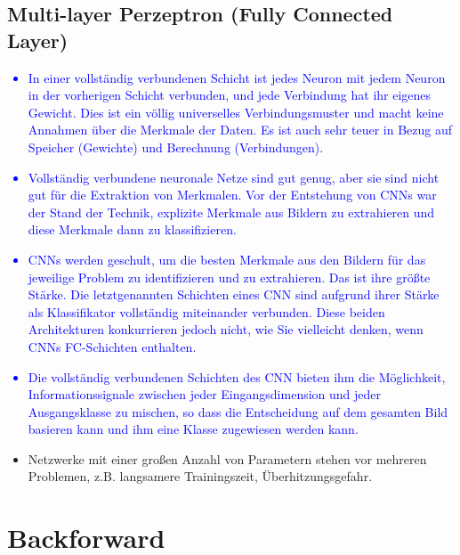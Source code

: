 \documentclass[12pt,a4paper]{scrartcl}
\numberwithin{equation}{section}
\begin{document}
\subsection{Multi-layer Perzeptron (Fully Connected Layer)}
\textcolor{blue}{
	\begin{itemize}
		\item In einer vollständig verbundenen Schicht ist jedes Neuron mit jedem Neuron in der vorherigen Schicht verbunden, und jede Verbindung hat ihr eigenes Gewicht. Dies ist ein völlig universelles Verbindungsmuster und macht keine Annahmen über die Merkmale der Daten. Es ist auch sehr teuer in Bezug auf Speicher (Gewichte) und Berechnung (Verbindungen).
		\item Vollständig verbundene neuronale Netze sind gut genug, aber sie sind nicht gut für die Extraktion von Merkmalen. Vor der Entstehung von CNNs war der Stand der Technik, explizite Merkmale aus Bildern zu extrahieren und diese Merkmale dann zu klassifizieren.
		\item CNNs werden geschult, um die besten Merkmale aus den Bildern für das jeweilige Problem zu identifizieren und zu extrahieren. Das ist ihre größte Stärke. Die letztgenannten Schichten eines CNN sind aufgrund ihrer Stärke als Klassifikator vollständig miteinander verbunden. Diese beiden Architekturen konkurrieren jedoch nicht, wie Sie vielleicht denken, wenn CNNs FC-Schichten enthalten.
		\item Die vollständig verbundenen Schichten des CNN bieten ihm die Möglichkeit, Informationssignale zwischen jeder Eingangsdimension und jeder Ausgangsklasse zu mischen, so dass die Entscheidung auf dem gesamten Bild basieren kann und ihm eine Klasse zugewiesen werden kann.
	\end{itemize}}
\begin{itemize}
	\item Netzwerke mit einer großen Anzahl von Parametern stehen vor mehreren Problemen, z.B. langsamere Trainingszeit, Überhitzungsgefahr.
\end{itemize}
\section{Backforward }
\end{document}

